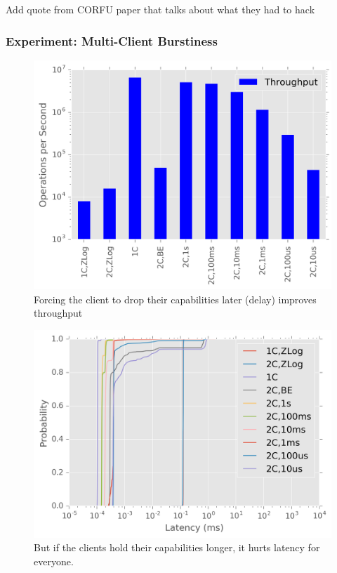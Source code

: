 \documentclass[10pt,twocolumn]{article}
\begin{document}
Add quote from CORFU paper that talks about what they had to hack

\subsubsection{Experiment: Multi-Client
Burstiness}\label{experiment-multi-client-burstiness}

\begin{figure}[htbp]
\centering
\includegraphics{figures/caps-delay-thruput.png}
\caption{Forcing the client to drop their capabilities later (delay)
improves throughput}
\end{figure}

\begin{figure}[htbp]
\centering
\includegraphics{figures/caps-delay-latency.png}
\caption{But if the clients hold their capabilities longer, it hurts
latency for everyone.}
\end{figure}
\end{document}
